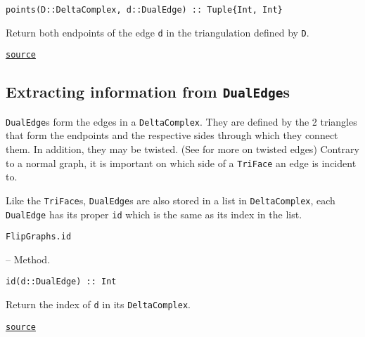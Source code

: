 \begin{adjustwidth}{2em}{0pt}


\begin{verbatim}
points(D::DeltaComplex, d::DualEdge) :: Tuple{Int, Int}
\end{verbatim}

Return both endpoints of the edge \texttt{d} in the triangulation defined by \texttt{D}.



\href{https://github.com/schto223/FlipGraphs.jl/blob/490c01a7adf74b42f27dda05099165c47ae8133e/src/deltaComplex.jl#L333-L337}{\texttt{source}}


\end{adjustwidth}

\subsection{Extracting information from \texttt{DualEdge}s}



\label{5107965111902850169}{}


\texttt{DualEdge}s form the edges in a \texttt{DeltaComplex}. They are defined by the 2 triangles that form the endpoints and the respective sides through which they connect them. In addition, they may be twisted. (See  for more on twisted edges) Contrary to a normal graph, it is important on which side of a \texttt{TriFace} an edge is incident to.



Like the \texttt{TriFace}s, \texttt{DualEdge}s are also stored in a list in \texttt{DeltaComplex}, each \texttt{DualEdge} has its proper \texttt{id} which is the same as its index in the list.


\hypertarget{16105808937943859257}{\texttt{FlipGraphs.id}}  -- {Method.}

\begin{adjustwidth}{2em}{0pt}


\begin{verbatim}
id(d::DualEdge) :: Int
\end{verbatim}

Return the index of \texttt{d} in its \texttt{DeltaComplex}.



\href{https://github.com/schto223/FlipGraphs.jl/blob/490c01a7adf74b42f27dda05099165c47ae8133e/src/deltaComplex.jl#L134-L138}{\texttt{source}}


\end{adjustwidth}

